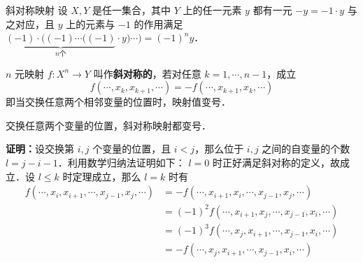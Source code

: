 

\begin{definition}{斜对称映射}\label{AntMap_def1}
设 $X,Y$ 是任一集合，其中 $Y$ 上的任一元素 $y$ 都有一元 $-y=-1\cdot y$ 与之对应，且 $y$ 上的元素与 $-1$ 的作用满足 $\underbrace{(-1)\cdot((-1)\cdots((-1)}_{n\text{个}}\cdot y)\cdots)=(-1)^n y$．

 $n$ 元映射 $f:X^n\rightarrow Y$ 叫作\textbf{斜对称的}，若对任意 $k=1,\cdots,n-1$，成立
\begin{equation}\label{AntMap_eq3}
f(\cdots,x_k,x_{k+1},\cdots)=-f(\cdots,x_{k+1},x_k,\cdots)
\end{equation}
即当交换任意两个相邻变量的位置时，映射值变号．
\end{definition}
\begin{theorem}{}\label{AntMap_the1}
交换任意两个变量的位置，斜对称映射都变号．
\end{theorem}
\textbf{证明：}设交换第 $i,j$ 个变量的位置，且 $i<j$，那么位于 $i,j$ 之间的自变量的个数 $l=j-i-1$．利用数学归纳法证明如下： $l=0$ 时正好满足斜对称的定义，故成立．设 $l\leq k$ 时定理成立，那么 $l=k$ 时有
\begin{equation}
\begin{aligned}
f(\cdots,x_i,x_{i+1},\cdots,x_{j-1},x_j,\cdots)&=-f(\cdots,x_{i+1},x_{i},\cdots,x_{j-1},x_j,\cdots)\\
&=(-1)^2 f(\cdots,x_{i+1},x_{j},\cdots,x_{j-1},x_i,\cdots)\\
&=(-1)^3 f(\cdots,x_{j},x_{i+1},\cdots,x_{j-1},x_i,\cdots)\\
&=-f(\cdots,x_{j},x_{i+1},\cdots,x_{j-1},x_i,\cdots)
\end{aligned}
\end{equation}
  
